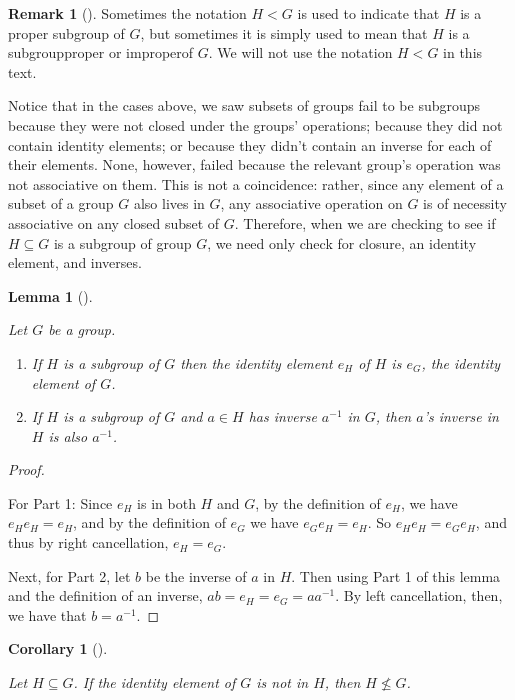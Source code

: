 \documentclass[10pt,]{book}
\theoremstyle{plain}
\newtheorem{corollary}[theorem]{Corollary}
\newtheorem{lemma}[theorem]{Lemma}
\theoremstyle{definition}
\theoremstyle{definition}
\newtheorem{remark}[theorem]{Remark}
\theoremstyle{definition}
\theoremstyle{definition}
\numberwithin{equation}{section}
\newcommand{\lt}{ < }
\begin{document}
\begin{remark}[]\label{remark-19}
Sometimes the notation \(H\lt G\)
        is used to indicate that \(H\) is a proper subgroup of \(G\), but
        sometimes it is simply used to mean that \(H\) is a
        subgroup\textemdash{}proper or improper\textemdash{}of \(G\). We will not use the notation \(H\lt G\) in this text.%
\end{remark}
\par

    Notice that in the cases above, we saw subsets of groups fail to be subgroups because
    they were not closed under the groups' operations; because they did not contain identity elements; or because they didn't contain an
    inverse for each of their elements. None, however, failed because the relevant group's operation was not associative on them.
    This is not a coincidence: rather, since any element of a subset of a group \(G\) also lives in \(G\), any associative operation on \(G\) is of
    necessity associative on any closed subset of \(G\). Therefore, when we are checking to see if \(H\subseteq G\) is a subgroup of group \(G\), we need only check for
    closure, an identity element, and inverses.
\begin{lemma}[{}]\label{subsame}

        Let \(G\) be a group.
        \leavevmode%
\begin{enumerate}
\item\hypertarget{li-193}{}
              If \(H\) is a subgroup of \(G\) then the identity element \(e_H\) of \(H\)
              is \(e_G\), the identity element of \(G\).
\item\hypertarget{li-194}{}
              If \(H\) is a subgroup of \(G\) and \(a\in H\) has inverse \(a^{-1}\) in \(G\), then \(a\)'s inverse in \(H\) is also \(a^{-1}\).
\end{enumerate}

\end{lemma}
\begin{proof}\hypertarget{proof-18}{}

      For Part 1: Since \(e_H\) is in both \(H\) and \(G\), by the definition
      of \(e_H\), we have
      \(e_He_H=e_H\), and by the definition of \(e_G\) we have \(e_Ge_H=e_H\). So \(e_He_H=e_Ge_H\), and thus by right
      cancellation, \(e_H=e_G\).
\par

      Next, for Part 2, let \(b\) be the inverse of \(a\) in \(H\). Then using Part 1 of this lemma and the definition of an inverse, \(ab=e_H=e_G=aa^{-1}\). By left cancellation, then, we have that \(b=a^{-1}\).
\end{proof}
\begin{corollary}[{}]\label{corollary-2}

        Let \(H\subseteq G\). If the identity element of \(G\) is not in \(H\), then \(H\not\leq G\).
\end{corollary}
\typeout{************************************************}
\typeout{************************************************}
\end{document}
